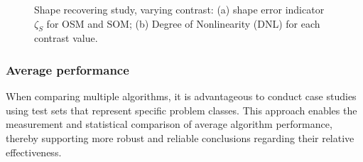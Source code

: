 \documentclass{IEEEtran}
\begin{document}
                \begin{figure}[!htb]
                    \centering
                     \hspace{0.01\columnwidth}
                    \caption{Shape recovering study, varying contrast: (a) shape error indicator $\zeta_S$ for OSM and SOM; (b) Degree of Nonlinearity (DNL) for each contrast value.}
                    \label{fig:shape:vary:indicators}
                \end{figure}

			\subsubsection{Average performance}\label{sec:results:shape:average}


                When comparing multiple algorithms, it is advantageous to conduct case studies using test sets that represent specific problem classes. This approach enables the measurement and statistical comparison of average algorithm performance, thereby supporting more robust and reliable conclusions regarding their relative effectiveness.
                
\end{document}

